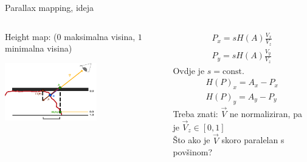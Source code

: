 \documentclass[9pt]{beamer}
\begin{document}
\begin{frame}{Parallax mapping, ideja}
	\begin{columns}
		\begin{column}{0.4\textwidth}
				Height map: ($0$ maksimalna visina, $1$ minimalna visina)
			\begin{center}
				\includegraphics[width=4cm]{slike/parallax_mapping_depth.png}
			\end{center}
		\end{column}
		\begin{column}{0.6\textwidth}
				\begin{align*}
			P_x = s H(A)\frac{V_x}{V_z} \\ 
			P_y = s H(A)\frac{V_y}{V_z}
			\end{align*}
			Ovdje je $s=\mathrm{const.}$ 
			\begin{align*}
			H(P)_x = A_x - P_x \\
			H(P)_y = A_y - P_y
			\end{align*}
			Treba znati: $\vec{V}$ ne normaliziran, pa je $\vec{V}_z \in \left[0, 1\right]$ \\
			Što ako je $\vec{V}$ skoro paralelan s povšinom?
		\end{column}
	\end{columns}
\end{frame}
\end{document}
